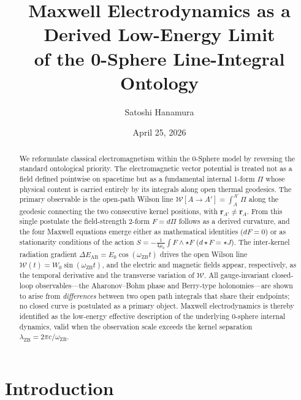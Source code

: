\documentclass[%
 reprint, amsmath,amssymb, aps, prb, ]{revtex4-2}
\numberwithin{equation}{section}
\newcommand{\omZB}{\omega_{\text{ZB}}}
\newcommand{\Egrad}{\Delta E_{\text{AB}}}
\newcommand{\WL}{\mathcal{W}}
\newcommand{\hodge}{\star}
\begin{document}
\title{Maxwell Electrodynamics as a Derived Low-Energy Limit\\
of the 0-Sphere Line-Integral Ontology}

\author{Satoshi Hanamura}
\date{April 25, 2026}

\begin{abstract}
We reformulate classical electromagnetism within the 0-Sphere model by reversing the standard ontological priority. The electromagnetic vector potential is treated not as a field defined pointwise on spacetime but as a fundamental internal 1-form $\Pi$ whose physical content is carried entirely by its integrals along open thermal geodesics. The primary observable is the open-path Wilson line $\WL[A\!\to\!A'] = \int_A^{A'}\Pi$ along the geodesic connecting the two consecutive kernel positions, with $\mathbf{r}_{A'}\neq\mathbf{r}_A$. From this single postulate the field-strength 2-form $F = d\Pi$ follows as a derived curvature, and the four Maxwell equations emerge either as mathematical identities ($dF=0$) or as stationarity conditions of the action $S=-\tfrac{1}{4\mu_0}\int F\wedge{\hodge}F$ ($d{\hodge}F=\hodge J$). The inter-kernel radiation gradient $\Egrad = E_0\cos(\omZB t)$ drives the open Wilson line $\WL(t) = W_0\sin(\omZB t)$, and the electric and magnetic fields appear, respectively, as the temporal derivative and the transverse variation of $\WL$. All gauge-invariant closed-loop observables---the Aharonov--Bohm phase and Berry-type holonomies---are shown to arise from \emph{differences} between two open path integrals that share their endpoints; no closed curve is postulated as a primary object. Maxwell electrodynamics is thereby identified as the low-energy effective description of the underlying 0-sphere internal dynamics, valid when the observation scale exceeds the kernel separation $\lambda_{\text{ZB}} = 2\pi c/\omZB$.
\end{abstract}

\maketitle

\section{Introduction}
\label{sec:intro}
\end{document}
